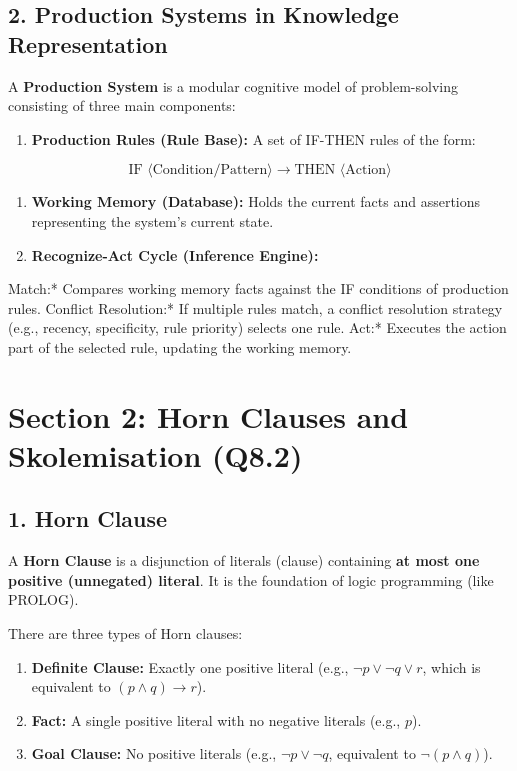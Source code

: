 \subsection{2. Production Systems in Knowledge Representation}
A \textbf{Production System} is a modular cognitive model of problem-solving consisting of three main components:
\begin{enumerate}
  \item \textbf{Production Rules (Rule Base):} A set of IF-THEN rules of the form:
\end{enumerate}
    \[ \text{IF } \langle\text{Condition/Pattern}\rangle \longrightarrow \text{THEN } \langle\text{Action}\rangle \]
\begin{enumerate}
  \item \textbf{Working Memory (Database):} Holds the current facts and assertions representing the system's current state.
  \item \textbf{Recognize-Act Cycle (Inference Engine):}
\end{enumerate}
    \textit{   }Match:* Compares working memory facts against the IF conditions of production rules.
    \textit{   }Conflict Resolution:* If multiple rules match, a conflict resolution strategy (e.g., recency, specificity, rule priority) selects one rule.
    \textit{   }Act:* Executes the action part of the selected rule, updating the working memory.


\section{Section 2: Horn Clauses and Skolemisation (Q8.2)}

\subsection{1. Horn Clause}
A \textbf{Horn Clause} is a disjunction of literals (clause) containing \textbf{at most one positive (unnegated) literal}. It is the foundation of logic programming (like PROLOG).

There are three types of Horn clauses:
\begin{enumerate}
  \item \textbf{Definite Clause:} Exactly one positive literal (e.g., $\neg p \lor \neg q \lor r$, which is equivalent to $(p \land q) \rightarrow r$).
  \item \textbf{Fact:} A single positive literal with no negative literals (e.g., $p$).
  \item \textbf{Goal Clause:} No positive literals (e.g., $\neg p \lor \neg q$, equivalent to $\neg(p \land q)$).
\end{enumerate}

